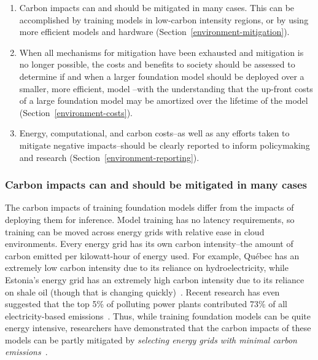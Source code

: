 \begin{enumerate}
    \item Carbon impacts can and should be mitigated in many cases. This can be accomplished by training models in low-carbon intensity regions, or by using more efficient models and hardware (Section~\ref{environment-mitigation}).
    \item When all mechanisms for mitigation have been exhausted and mitigation is no longer possible, the costs and benefits to society should be assessed to determine if and when a larger foundation model should be deployed over a smaller, more efficient, model --with the understanding that the up-front costs of a large foundation model may be amortized over the lifetime of the model (Section~\ref{environment-costs}).
    \item Energy, computational, and carbon costs--as well as any efforts taken to mitigate negative impacts--should be clearly reported to inform policymaking and research (Section~\ref{environment-reporting}).
\end{enumerate}

\subsubsection{Carbon impacts can and should be mitigated in many cases}
\label{sec:environment-mitigation}
The  carbon impacts of training foundation models differ from the impacts of deploying them for inference. Model training has no latency requirements, so  training  can be moved across energy grids with relative ease in cloud environments. Every energy grid has its own carbon intensity--the amount of carbon emitted per kilowatt-hour of energy used. For example, Qu\'ebec has an extremely low carbon intensity due to its reliance on hydroelectricity, while Estonia's energy grid has an extremely high carbon intensity due to its reliance on shale oil (though that is changing quickly)~\citep{henderson2020towards}. Recent research has even suggested that the top 5\% of polluting power plants contributed 73\% of all electricity-based emissions~\citep{grant2021reducing}. Thus, while training foundation models can be quite energy intensive, researchers have demonstrated that the carbon impacts of these models can be partly mitigated by \textit{selecting energy grids with minimal carbon emissions}~\citep{henderson2020towards,lacoste2019quantifying,patterson2021carbon}. 

